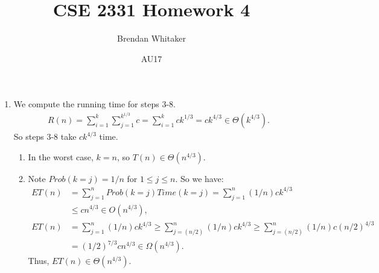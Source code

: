 \documentclass[10pt,oneside,reqno]{amsart}
\theoremstyle{plain}
\theoremstyle{definition}
\begin{document}
\title{CSE 2331 Homework 4}

\date{AU17}

\author[Brendan Whitaker]{Brendan Whitaker}

\maketitle

\begin{enumerate}[label=\arabic*.]

\item We compute the running time for steps 3-8. 
\begin{equation}
\begin{aligned}
R(n) = \sum_{i = 1}^k \sum_{j = 1}^{k^{1/3}} c =  \sum_{i = 1}^kck^{1/3} = ck^{4/3} \in \Theta(k^{4/3}). 
\end{aligned}
\end{equation}
So steps 3-8 take $ck^{4/3}$ time. 
\begin{enumerate}
\item In the worst case, $k = n$, so $T(n) \in \Theta(n^{4/3})$. 
\item Note $Prob(k = j) = 1/n$ for $1 \leq j \leq n$. So we have:
\begin{equation}
\begin{aligned}
ET(n) &= \sum_{j = 1}^nProb(k = j)Time(k = j) = \sum_{j = 1}^n(1/n)ck^{4/3}\\
&\leq cn^{4/3} \in O(n^{4/3}),\\
ET(n) &= \sum_{j = 1}^n(1/n)ck^{4/3} \geq \sum_{j = (n/2)}^n(1/n)ck^{4/3}\geq \sum_{j = (n/2)}^n(1/n)c(n/2)^{4/3}\\
&= (1/2)^{7/3}cn^{4/3}  \in \Omega(n^{4/3}). 
\end{aligned}
\end{equation}
Thus, $ET(n) \in \Theta(n^{4/3})$. \\
\end{enumerate}


\end{enumerate}
\end{document}
